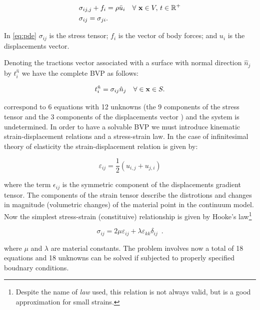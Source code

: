 \begin{equation} \label{eq:pde}
\begin{aligned}
&\sigma_{ij,j} + {f_i} = \rho\ddot{u}_i \quad \forall\ \vb{x} \in V,\, t \in \mathbb{R}^{+}\\
&\sigma_{ij}=\sigma _{ji}.
\end{aligned} 
\end{equation}

In \cref{eq:pde} $\sigma_{ij}$ is the stress tensor; $f_i$ is the vector of body forces; and $u_i$ is the displacements vector.

Denoting the tractions vector associated with a surface with normal direction $\hat{n}_{j}$ by $t_i^{\hat n}$ we have the complete BVP as follows:

\begin{equation} \label{eq:bcs}
t_i^{\hat n} = \sigma_{ij} \hat{n}_{j} \quad \forall \in \vb{x} \in S.
\end{equation}

 correspond to 6 equations with 12 unknowns (the 9 components of the stress tensor and the 3 components of the displacements vector ) and the system is undetermined. In order to have a solvable BVP we must introduce kinematic strain-displacement relations and a stress-strain law. In the case of infinitesimal theory of elasticity the strain-displacement relation is given by:

\begin{equation}\label{eq:kin}
\varepsilon_{ij} = \frac{1}{2}(u_{i,j} + u_{j,i})
\end{equation}

where the term $\epsilon_{ij}$ is the symmetric component of the displacements gradient tensor. The components of the strain tensor describe the distrotions and changes in magnitude (volumetric changes) of the material point in the continuum model. Now the simplest stress-strain (constituive) relationship is given by Hooke's law\footnote{Despite the name of \emph{law} used, this relation is not always valid, but is a good approximation for small strains.}

\begin{equation} \label{eq:Hooke}
\sigma_{ij} = 2\mu \varepsilon_{ij} + \lambda \varepsilon_{kk}\delta_{ij} \enspace .
\end{equation}

where $\mu$ and $\lambda$ are material constants. The problem involves now a total of 18 equations and 18 unknowns can be solved if subjected to properly specified boudnary conditions.

